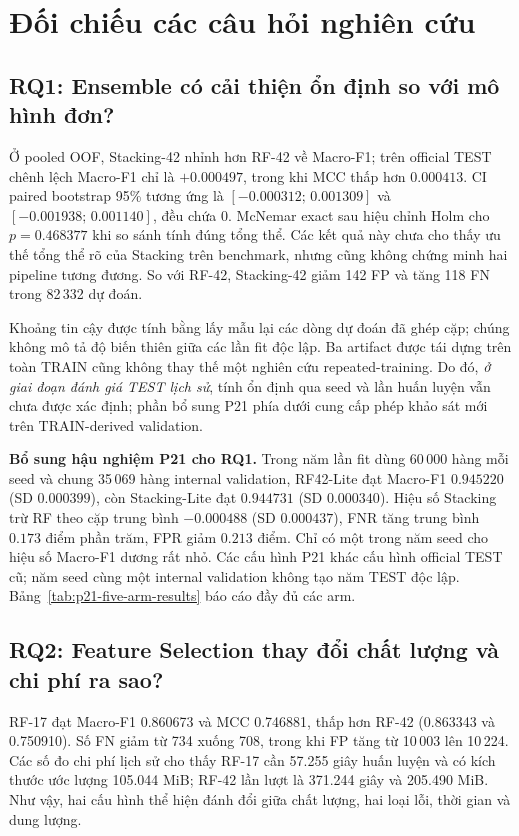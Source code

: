 \section{Đối chiếu các câu hỏi nghiên cứu}
\label{sec:revision-rq-all}

\subsection{RQ1: Ensemble có cải thiện ổn định so với mô hình đơn?}
\label{sec:revision-rq1}
Ở pooled OOF, Stacking-42 nhỉnh hơn RF-42 về Macro-F1; trên official TEST chênh lệch Macro-F1 chỉ là $+0.000497$, trong khi MCC thấp hơn $0.000413$. CI paired bootstrap 95\% tương ứng là $[-0.000312;\,0.001309]$ và $[-0.001938;\,0.001140]$, đều chứa 0. McNemar exact sau hiệu chỉnh Holm cho $p=0.468377$ khi so sánh tính đúng tổng thể. Các kết quả này chưa cho thấy ưu thế tổng thể rõ của Stacking trên benchmark, nhưng cũng không chứng minh hai pipeline tương đương. So với RF-42, Stacking-42 giảm 142 FP và tăng 118 FN trong 82\,332 dự đoán.

Khoảng tin cậy được tính bằng lấy mẫu lại các dòng dự đoán đã ghép cặp; chúng không mô tả độ biến thiên giữa các lần fit độc lập. Ba artifact được tái dựng trên toàn TRAIN cũng không thay thế một nghiên cứu repeated-training. Do đó, \emph{ở giai đoạn đánh giá TEST lịch sử}, tính ổn định qua seed và lần huấn luyện vẫn chưa được xác định; phần bổ sung P21 phía dưới cung cấp phép khảo sát mới trên TRAIN-derived validation.

\noindent\textbf{Bổ sung hậu nghiệm P21 cho RQ1.}
Trong năm lần fit dùng 60\,000 hàng mỗi seed và chung 35\,069 hàng internal validation, RF42-Lite đạt Macro-F1 $0.945220$ (SD $0.000399$), còn Stacking-Lite đạt $0.944731$ (SD $0.000340$). Hiệu số Stacking trừ RF theo cặp trung bình $-0.000488$ (SD $0.000437$), FNR tăng trung bình $0.173$ điểm phần trăm, FPR giảm $0.213$ điểm. Chỉ có một trong năm seed cho hiệu số Macro-F1 dương rất nhỏ. Các cấu hình P21 khác cấu hình official TEST cũ; năm seed cùng một internal validation không tạo năm TEST độc lập. Bảng~\ref{tab:p21-five-arm-results} báo cáo đầy đủ các arm.

\subsection{RQ2: Feature Selection thay đổi chất lượng và chi phí ra sao?}
\label{sec:revision-rq2}
RF-17 đạt Macro-F1 0.860673 và MCC 0.746881, thấp hơn RF-42 (0.863343 và 0.750910). Số FN giảm từ 734 xuống 708, trong khi FP tăng từ 10\,003 lên 10\,224. Các số đo chi phí lịch sử cho thấy RF-17 cần 57.255 giây huấn luyện và có kích thước ước lượng 105.044 MiB; RF-42 lần lượt là 371.244 giây và 205.490 MiB. Như vậy, hai cấu hình thể hiện đánh đổi giữa chất lượng, hai loại lỗi, thời gian và dung lượng.

